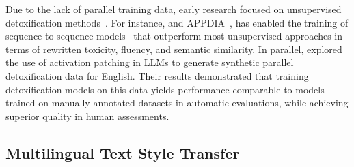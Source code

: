 
Due to the lack of parallel training data, early research focused on unsupervised detoxification methods~\cite{DBLP:conf/acl/SantosMP18, DBLP:conf/emnlp/DaleVDLKSP21, DBLP:conf/acl/HallinanL0S23, DBLP:conf/emnlp/PourFBVPS23}. For instance,\cite{DBLP:conf/acl/LogachevaDUMDKS22} and APPDIA~\cite{DBLP:conf/coling/AtwellHA22}, has enabled the training of sequence-to-sequence models~\cite{DBLP:conf/acl/LogachevaDUMDKS22, DBLP:conf/emnlp/PourFBVPS23} that outperform most unsupervised approaches in terms of rewritten toxicity, fluency, and semantic similarity. In parallel, \citet{DBLP:conf/emnlp/MoskovskiyPP24} explored the use of activation patching in LLMs to generate synthetic parallel detoxification data for English. Their results demonstrated that training detoxification models on this data yields performance comparable to models trained on manually annotated datasets in automatic evaluations, while achieving superior quality in human assessments.

\subsection{Multilingual Text Style Transfer}

